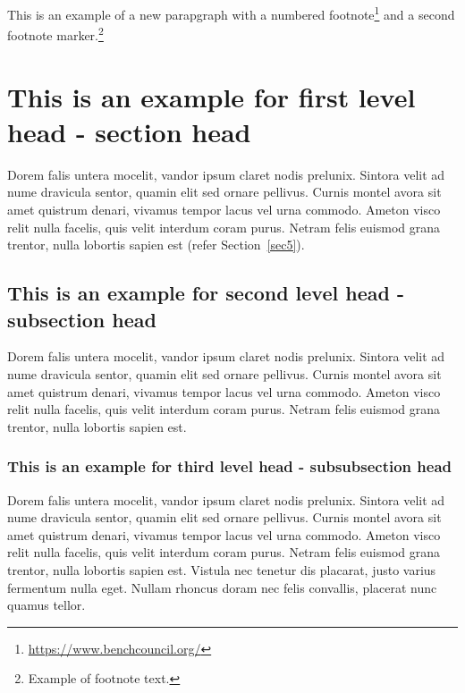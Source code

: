 \documentclass[namedate,webpdf,contemporary,large]{TBench-template}%
\theoremstyle{thmstyleone}%
\theoremstyle{thmstyletwo}%
\theoremstyle{thmstylethree}%
\begin{document}
This is an example of a new parapgraph with a numbered footnote\footnote{\url{https://www.benchcouncil.org/}} and a second footnote marker.\footnote{Example of footnote text.}



\section{This is an example for first level head - section head}\label{sec2}
Dorem falis untera mocelit, vandor ipsum claret nodis prelunix. Sintora velit ad nume dravicula sentor, quamin elit sed ornare pellivus. Curnis montel avora sit amet quistrum denari, vivamus tempor lacus vel urna commodo. Ameton visco relit nulla facelis, quis velit interdum coram purus. Netram felis euismod grana trentor, nulla lobortis sapien est (refer Section~\ref{sec5}).

\subsection{This is an example for second level head - subsection head}\label{subsec1}

Dorem falis untera mocelit, vandor ipsum claret nodis prelunix. Sintora velit ad nume dravicula sentor, quamin elit sed ornare pellivus. Curnis montel avora sit amet quistrum denari, vivamus tempor lacus vel urna commodo. Ameton visco relit nulla facelis, quis velit interdum coram purus. Netram felis euismod grana trentor, nulla lobortis sapien est. 

\subsubsection{This is an example for third level head - subsubsection head}\label{subsubsec1}

Dorem falis untera mocelit, vandor ipsum claret nodis prelunix. Sintora velit ad nume dravicula sentor, quamin elit sed ornare pellivus. Curnis montel avora sit amet quistrum denari, vivamus tempor lacus vel urna commodo. Ameton visco relit nulla facelis, quis velit interdum coram purus. Netram felis euismod grana trentor, nulla lobortis sapien est. Vistula nec tenetur dis placarat, justo varius fermentum nulla eget. Nullam rhoncus doram nec felis convallis, placerat nunc quamus tellor. %
\end{document}

